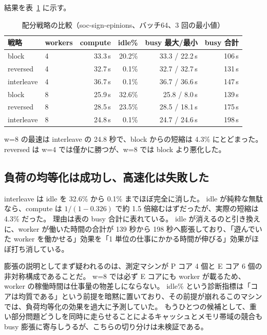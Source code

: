 結果を表~\ref{tab:alloc} に示す。

\begin{table}[htbp]
  \centering
  \caption{配分戦略の比較（soc-sign-epinions、バッチ64、3 回の最小値）}
  \label{tab:alloc}
  \begin{tabular}{llrrrr}
    \toprule
    戦略 & workers & compute & idle\% & busy 最大/最小 & busy 合計 \\
    \midrule
    block      & 4 & 33.3\,s & 20.2\% & 33.3 / 22.2\,s & 106\,s \\
    reversed   & 4 & 32.7\,s & 0.1\%  & 32.7 / 32.7\,s & 131\,s \\
    interleave & 4 & 36.7\,s & 0.1\%  & 36.7 / 36.6\,s & 147\,s \\
    block      & 8 & 25.9\,s & 32.6\% & 25.8 / 8.0\,s  & 139\,s \\
    reversed   & 8 & 28.5\,s & 23.5\% & 28.5 / 18.1\,s & 175\,s \\
    interleave & 8 & 24.8\,s & 0.1\%  & 24.7 / 24.6\,s & 198\,s \\
    \bottomrule
  \end{tabular}
\end{table}

w=8 の最速は interleave の 24.8 秒で、block からの短縮は 4.3\% にとどまった。
reversed は w=4 では僅かに勝つが、w=8 では block より悪化した。

\subsection{負荷の均等化は成功し、高速化は失敗した}

interleave は idle を 32.6\% から 0.1\% までほぼ完全に消した。
idle が純粋な無駄なら、compute は $1/(1-0.326)$ で約 1.5 倍縮むはずだったが、実際の短縮は 4.3\% だった。
理由は表の busy 合計に表れている。
idle が消えるのと引き換えに、worker が働いた時間の合計が 139 秒から 198 秒へ膨張しており、「遊んでいた worker を働かせる」効果を「1 単位の仕事にかかる時間が伸びる」効果がほぼ打ち消している。

膨張の説明としてまず疑われるのは、測定マシンが P コア 4 個と E コア 6 個の非対称構成であることだ。
w=8 では必ず E コアにも worker が載るため、worker の稼働時間は仕事量の物差しにならない。
idle\% という診断指標は「コアは均質である」という前提を暗黙に置いており、その前提が崩れるこのマシンでは、負荷均等化の効果を過大に予測していた。
もうひとつの候補として、重い部分問題どうしを同時に走らせることによるキャッシュとメモリ帯域の競合も busy 膨張に寄与しうるが、こちらの切り分けは未検証である。

